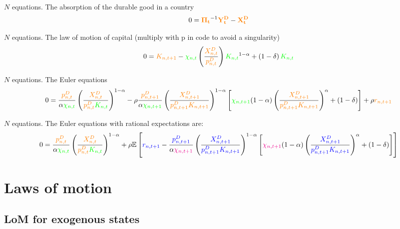 \documentclass[11pt]{article}
\newcommand{\cl}[1]{{\color{orange}{#1}}}
\newcommand{\st}[1]{{\color{green}{#1}}}
\newcommand{\stnext}[1]{{\color{magenta}{#1}}}
\newcommand{\clnext}[1]{{\color{blue}{#1}}}
\begin{document}
\noindent $N$ equations. The absorption of the durable good in a country 
\begin{equation}
0 = \mathbf{\cl{\Pi_t}}^{-1} \mathbf{\cl{Y^D_t}} - \mathbf{\cl{X^D_t}}
\end{equation}

\noindent $N$ equations. The law of motion of capital (multiply with p in code to avoid a singularity)
\begin{equation}
0 = \cl{K_{n,t+1}} - \st{\chi_{n,t}} \left( \frac{\cl{X_{n,t}^D}}{\cl{p_{n,t}^D}} \right) \st{K_{n,t}}^{1-\alpha} + \left(1 - \delta\right) \st{K_{n,t}}
\end{equation}

\noindent $N$ equations. The Euler equations
\begin{equation}
0 = \frac{\cl{p_{n, t}^{D}}}{\alpha \st{\chi_{n, t}}}\left(\frac{\cl{X_{n, t}^{D}}}{\cl{p_{n, t}^{D}} \st{K_{n, t}}}\right)^{1-\alpha} - \rho \frac{\cl{p_{n, t+1}^{D}}}{\alpha \st{\chi_{n, t+1}}}\left(\frac{\cl{X_{n, t+1}^{D}}}{\cl{p_{n, t+1}^{D}} \cl{K_{n, t+1}}}\right)^{1-\alpha}\left[\st{\chi_{n, t+1}}(1-\alpha)\left(\frac{\cl{X_{n, t+1}^{D}}}{\cl{p_{n, t+1}^{D}} \cl{K_{n, t+1}}}\right)^{\alpha}+(1-\delta)\right]+\rho \cl{r_{n, t+1}}
\end{equation}

\noindent $N$ equations. The Euler equations with rational expectations are:
\begin{equation}
0 = \frac{\cl{p_{n, t}^{D}}}{\alpha \st{\chi_{n, t}}}\left(\frac{\cl{X_{n, t}^{D}}}{\cl{p_{n, t}^{D}} \st{K_{n, t}}}\right)^{1-\alpha} + \rho \mathbb{E}\left[\clnext{r_{n, t+1}} - \frac{\clnext{p_{n, t+1}^{D}}}{\alpha \stnext{\chi_{n, t+1}}}\left(\frac{\clnext{X_{n, t+1}^{D}}}{\clnext{p_{n, t+1}^{D}} \clnext{K_{n, t+1}}}\right)^{1-\alpha}\left[\stnext{\chi_{n, t+1}}(1-\alpha)\left(\frac{\clnext{X_{n, t+1}^{D}}}{\clnext{p_{n, t+1}^{D}} \clnext{K_{n, t+1}}}\right)^{\alpha}+(1-\delta)\right]\right]
\end{equation}


\section{Laws of motion}

\subsection{LoM for exogenous states}
\end{document}
